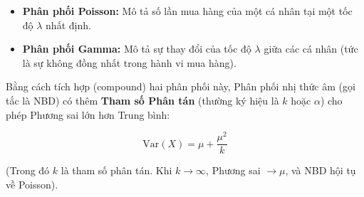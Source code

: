 \begin{itemize}
\item \textbf{Phân phối Poisson:} Mô tả số lần mua hàng của một cá nhân tại một tốc độ $\lambda$ nhất định.
\item \textbf{Phân phối Gamma:} Mô tả sự thay đổi của tốc độ $\lambda$ giữa các cá nhân (tức là sự không đồng nhất trong hành vi mua hàng).
\end{itemize}

Bằng cách tích hợp (compound) hai phân phối này, 
Phân phối nhị thức âm (gọi tắc là NBD) 
có thêm \textbf{Tham số Phân tán} 
(thường ký hiệu là $k$ hoặc $\alpha$) 
cho phép Phương sai lớn hơn Trung bình:

$$\mathrm{Var}(X) = \mu + \frac{\mu^2}{k}$$

(Trong đó $k$ là tham số phân tán. Khi $k \to \infty$, Phương sai $\to \mu$, và NBD hội tụ về Poisson).